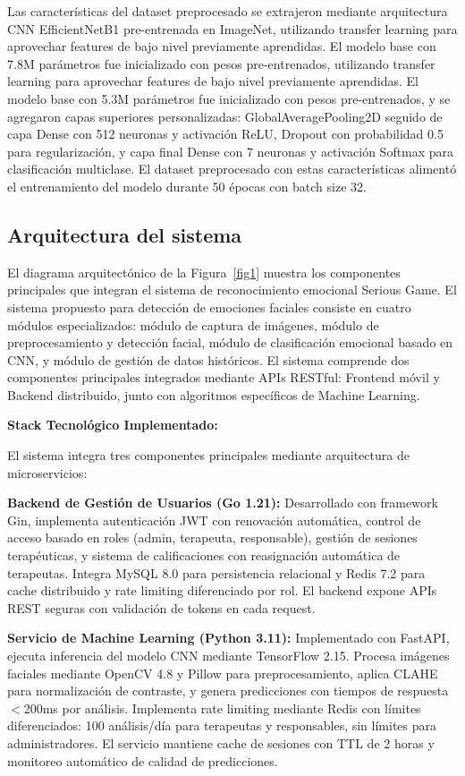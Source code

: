 \documentclass[journal,article,submit,pdftex,moreauthors]{Definitions/mdpi}
\begin{document}
	Las características del dataset preprocesado se extrajeron mediante arquitectura CNN EfficientNetB1 \cite{ref21} pre-entrenada en ImageNet, utilizando transfer learning para aprovechar features de bajo nivel previamente aprendidas. El modelo base con 7.8M parámetros fue inicializado con pesos pre-entrenados, utilizando transfer learning para aprovechar features de bajo nivel previamente aprendidas. El modelo base con 5.3M parámetros fue inicializado con pesos pre-entrenados, y se agregaron capas superiores personalizadas: GlobalAveragePooling2D seguido de capa Dense con 512 neuronas y activación ReLU, Dropout con probabilidad 0.5 para regularización, y capa final Dense con 7 neuronas y activación Softmax para clasificación multiclase. El dataset preprocesado con estas características alimentó el entrenamiento del modelo durante 50 épocas con batch size 32.
	
	\subsection{Arquitectura del sistema}
	
	El diagrama arquitectónico de la Figura~\ref{fig1} muestra los componentes principales que integran el sistema de reconocimiento emocional Serious Game. El sistema propuesto para detección de emociones faciales consiste en cuatro módulos especializados: módulo de captura de imágenes, módulo de preprocesamiento y detección facial, módulo de clasificación emocional basado en CNN, y módulo de gestión de datos históricos. El sistema comprende dos componentes principales integrados mediante APIs RESTful: Frontend móvil y Backend distribuido, junto con algoritmos específicos de Machine Learning.
	
	\textbf{Stack Tecnológico Implementado:}
	
	El sistema integra tres componentes principales mediante arquitectura de microservicios:
	
	\textbf{Backend de Gestión de Usuarios (Go 1.21):} Desarrollado con framework Gin, implementa autenticación JWT con renovación automática, control de acceso basado en roles (admin, terapeuta, responsable), gestión de sesiones terapéuticas, y sistema de calificaciones con reasignación automática de terapeutas. Integra MySQL 8.0 para persistencia relacional y Redis 7.2 para cache distribuido y rate limiting diferenciado por rol. El backend expone APIs REST seguras con validación de tokens en cada request.
	
	\textbf{Servicio de Machine Learning (Python 3.11):} Implementado con FastAPI, ejecuta inferencia del modelo CNN mediante TensorFlow 2.15. Procesa imágenes faciales mediante OpenCV 4.8 y Pillow para preprocesamiento, aplica CLAHE para normalización de contraste, y genera predicciones con tiempos de respuesta $<$200ms por análisis. Implementa rate limiting mediante Redis con límites diferenciados: 100 análisis/día para terapeutas y responsables, sin límites para administradores. El servicio mantiene cache de sesiones con TTL de 2 horas y monitoreo automático de calidad de predicciones.
	
\end{document}
